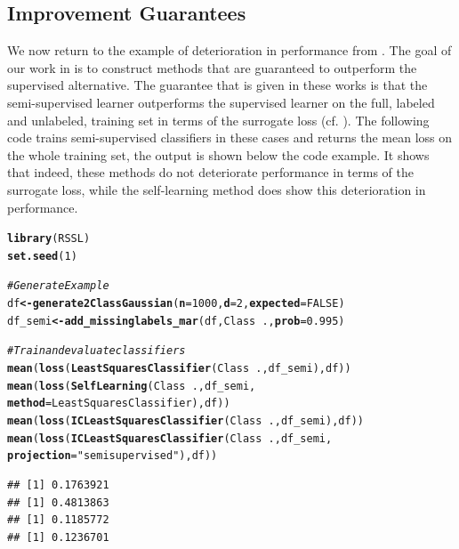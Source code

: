 \documentclass[twoside]{memoir}\usepackage[]{graphicx}\usepackage{xcolor}
\makeatletter
\newcommand{\hlnum}[1]{\textcolor[rgb]{0,0,0}{#1}}%
\newcommand{\hlstr}[1]{\textcolor[rgb]{0,0,0}{#1}}%
\newcommand{\hlcom}[1]{\textcolor[rgb]{0.4,0.4,0.4}{\textit{#1}}}%
\newcommand{\hlopt}[1]{\textcolor[rgb]{0,0,0}{\textbf{#1}}}%
\newcommand{\hlstd}[1]{\textcolor[rgb]{0,0,0}{#1}}%
\newcommand{\hlkwb}[1]{\textcolor[rgb]{0,0,0}{\textbf{#1}}}%
\newcommand{\hlkwc}[1]{\textcolor[rgb]{0,0,0}{\textbf{#1}}}%
\newcommand{\hlkwd}[1]{\textcolor[rgb]{0,0,0}{\textbf{#1}}}%
\newenvironment{kframe}{%
 \def\at@end@of@kframe{}%
 \ifinner\ifhmode%
  \def\at@end@of@kframe{\end{minipage}}%
  \begin{minipage}{\columnwidth}%
 \fi\fi%
 \def\FrameCommand##1{\hskip\@totalleftmargin \hskip-\fboxsep
 \colorbox{shadecolor}{##1}\hskip-\fboxsep
     \hskip-\linewidth \hskip-\@totalleftmargin \hskip\columnwidth}%
 \MakeFramed {\advance\hsize-\width
   \@totalleftmargin\z@ \linewidth\hsize
   \@setminipage}}%
 {\par\unskip\endMakeFramed%
 \at@end@of@kframe}
\newenvironment{knitrout}{}{} %
\renewcommand{\cite}{\citep}
\makeatother
\begin{document}
\subsection{Improvement Guarantees}
We now return to the example of deterioration in performance from . The goal of our work in \cite{Loog2016,Krijthe2016a,Krijthe2017} is to construct methods that are guaranteed to outperform the supervised alternative. The guarantee that is given in these works is that the semi-supervised learner outperforms the supervised learner on the full, labeled and unlabeled, training set in terms of the surrogate loss (cf. \cite{Loog2014b}). The following code trains semi-supervised classifiers in these cases and returns the mean loss on the whole training set, the output is shown below the code example. It shows that indeed, these methods do not deteriorate performance in terms of the surrogate loss, while the self-learning method does show this deterioration in performance.
\begin{knitrout}
\color{fgcolor}\begin{kframe}
\begin{alltt}
\hlkwd{library}\hlstd{(RSSL)}
\hlkwd{set.seed}\hlstd{(}\hlnum{1}\hlstd{)}

\hlcom{# Generate Example}
\hlstd{df} \hlkwb{<-} \hlkwd{generate2ClassGaussian}\hlstd{(}\hlkwc{n}\hlstd{=}\hlnum{1000}\hlstd{,} \hlkwc{d}\hlstd{=}\hlnum{2}\hlstd{,} \hlkwc{expected}\hlstd{=}\hlnum{FALSE}\hlstd{)}
\hlstd{df_semi} \hlkwb{<-} \hlkwd{add_missinglabels_mar}\hlstd{(df, Class}\hlopt{~}\hlstd{.,} \hlkwc{prob}\hlstd{=}\hlnum{0.995}\hlstd{)}

\hlcom{# Train and evaluate classifiers}
\hlkwd{mean}\hlstd{(}\hlkwd{loss}\hlstd{(}\hlkwd{LeastSquaresClassifier}\hlstd{(Class}\hlopt{~}\hlstd{.,df_semi),df))}
\hlkwd{mean}\hlstd{(}\hlkwd{loss}\hlstd{(}\hlkwd{SelfLearning}\hlstd{(Class}\hlopt{~}\hlstd{.,df_semi,}
                        \hlkwc{method}\hlstd{=LeastSquaresClassifier),df))}
\hlkwd{mean}\hlstd{(}\hlkwd{loss}\hlstd{(}\hlkwd{ICLeastSquaresClassifier}\hlstd{(Class}\hlopt{~}\hlstd{.,df_semi),df))}
\hlkwd{mean}\hlstd{(}\hlkwd{loss}\hlstd{(}\hlkwd{ICLeastSquaresClassifier}\hlstd{(Class}\hlopt{~}\hlstd{.,df_semi,}
                          \hlkwc{projection}\hlstd{=}\hlstr{"semisupervised"}\hlstd{),df))}
\end{alltt}
\begin{verbatim}
## [1] 0.1763921
## [1] 0.4813863
## [1] 0.1185772
## [1] 0.1236701
\end{verbatim}
\end{kframe}
\end{knitrout}
\end{document}

